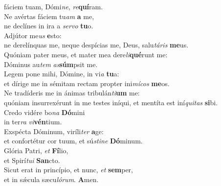 \oddverse fáciem tuam, Dómi\textit{ne}, \textit{re}\textbf{quí}ram.\\
\evenverse Ne avértas fáciem tu\textit{am} \textbf{a} me,~\*\\
\evenverse ne declínes in ira a \textit{ser}\textit{vo} \textbf{tu}o.\\
\oddverse Adjútor me\textit{us} \textbf{e}sto:~\*\\
\oddverse ne derelínquas me, neque despícias me, Deus, salu\textit{tá}\textit{ris} \textbf{me}us.\\
\evenverse Quóniam pater meus, et mater mea dere\textit{li}\textbf{qué}runt me:~\*\\
\evenverse Dóminus au\textit{tem} \textit{as}\textbf{súm}psit me.\\
\oddverse Legem pone mihi, Dómine, in vi\textit{a} \textbf{tu}a:~\*\\
\oddverse et dírige me in sémitam rectam propter ini\textit{mí}\textit{cos} \textbf{me}os.\\
\evenverse Ne tradíderis me in ánimas tribulán\textit{ti}\textbf{um} me:~\*\\
\evenverse quóniam insurrexérunt in me testes iníqui, et mentíta est iní\textit{qui}\textit{tas} \textbf{si}bi.\\
\oddverse Credo vidére bo\textit{na} \textbf{Dó}mini~\*\\
\oddverse in ter\textit{ra} \textit{vi}\textbf{vén}tium.\\
\evenverse Exspécta Dóminum, viríli\textit{ter} \textbf{a}ge:~\*\\
\evenverse et confortétur cor tuum, et sú\textit{sti}\textit{ne} \textbf{Dó}minum.\\
\oddverse Glória Patri, \textit{et} \textbf{Fí}lio,~\*\\
\oddverse et Spirí\textit{tu}\textit{i} \textbf{San}cto.\\
\evenverse Sicut erat in princípio, et nunc, \textit{et} \textbf{sem}per,~\*\\
\evenverse et in sǽcula sæcu\textit{ló}\textit{rum}. \textbf{A}men.\\
